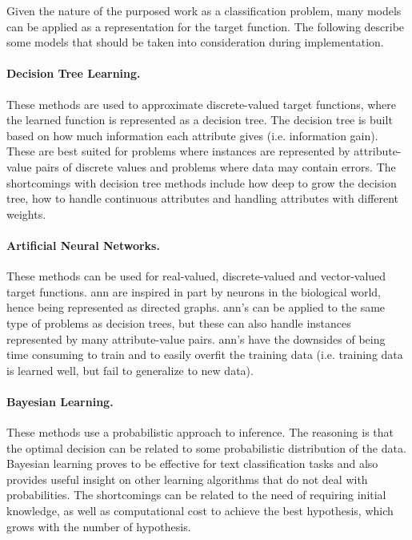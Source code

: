Given the nature of the purposed work as a classification problem, many models can be applied as a representation for the target function. The following describe some models that should be taken into consideration during implementation.

\paragraph{Decision Tree Learning.}\cite{mitchell:ml} These methods are used to approximate discrete-valued target functions, where the learned function is represented as a decision tree. The decision tree is built based on how much information each attribute gives (i.e. information gain). These are best suited for problems where instances are represented by attribute-value pairs of discrete values and problems where data may contain errors. The shortcomings with decision tree methods include how deep to grow the decision tree, how to handle continuous attributes and handling attributes with different weights.

\paragraph{Artificial Neural Networks.}\cite{mitchell:ml} These methods can be used for real-valued, discrete-valued and vector-valued target functions. \gls{ann} are inspired in part by neurons in the biological world, hence being represented as directed graphs. \gls{ann}'s can be applied to the same type of problems as decision trees, but these can also handle instances represented by many attribute-value pairs. \gls{ann}'s have the downsides of being time consuming to train and to easily overfit the training data (i.e. training data is learned well, but fail to generalize to new data).

\paragraph{Bayesian Learning.}\cite{mitchell:ml} These methods use a probabilistic approach to inference. The reasoning is that the optimal decision can be related to some probabilistic distribution of the data. Bayesian learning proves to be effective for text classification tasks and also provides useful insight on other learning algorithms that do not deal with probabilities. The shortcomings can be related to the need of requiring initial knowledge, as well as computational cost to achieve the best hypothesis, which grows with the number of hypothesis.\\

